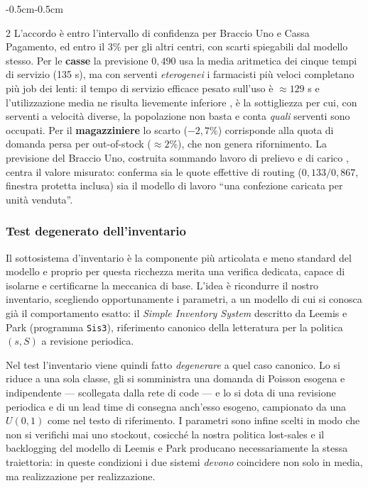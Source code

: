\documentclass{article}
\begin{document}
\begin{adjustwidth}{-0.5cm}{-0.5cm}
\begin{multicols}{2}
L'accordo è entro l'intervallo di confidenza per Braccio Uno e Cassa Pagamento, ed entro il 3\%
per gli altri centri, con scarti spiegabili dal modello stesso. Per le \textbf{casse} la
previsione $0{,}490$ usa la media aritmetica dei cinque tempi di servizio (135 s), ma con serventi
\emph{eterogenei} i farmacisti più veloci completano più job dei lenti: il tempo di servizio
efficace pesato sull'uso è $\approx 129$ s e l'utilizzazione media ne risulta lievemente inferiore
,  è la sottigliezza per cui, con serventi a velocità diverse, la popolazione non basta e conta
\emph{quali} serventi sono occupati. Per il \textbf{magazziniere} lo scarto ($-2{,}7\%$)
corrisponde alla quota di domanda persa per out-of-stock ($\approx 2\%$), che non genera
rifornimento. La previsione del Braccio Uno,  costruita sommando lavoro di prelievo e di carico
,  centra il valore misurato: conferma sia le quote effettive di routing ($0{,}133/0{,}867$,
finestra protetta inclusa) sia il modello di lavoro ``una confezione caricata per unità
venduta''.

\subsubsection*{Test degenerato dell'inventario}
Il sottosistema d'inventario è la componente più articolata e meno standard del modello e proprio per questa ricchezza merita una verifica dedicata, capace di isolarne e certificarne la meccanica di base. L'idea è
ricondurre il nostro inventario, scegliendo opportunamente i parametri, a un modello di cui si
conosca già il comportamento esatto: il \emph{Simple Inventory System} descritto da Leemis e Park
(programma \texttt{Sis3}), riferimento canonico della letteratura per la politica $(s,S)$ a
revisione periodica.

Nel test l'inventario viene quindi fatto \emph{degenerare} a quel caso canonico. Lo si riduce a una
sola classe, gli si somministra una domanda di Poisson esogena e indipendente --- scollegata dalla
rete di code --- e lo si dota di una revisione periodica e di un lead time di consegna anch'esso
esogeno, campionato da una $U(0,1)$ come nel testo di riferimento. I parametri sono infine scelti in
modo che non si verifichi mai uno stockout, cosicché la nostra politica lost-sales e il backlogging
del modello di Leemis e Park producano necessariamente la stessa traiettoria: in queste condizioni i
due sistemi \emph{devono} coincidere non solo in media, ma realizzazione per realizzazione.


\end{multicols}
\end{adjustwidth}
\end{document}
